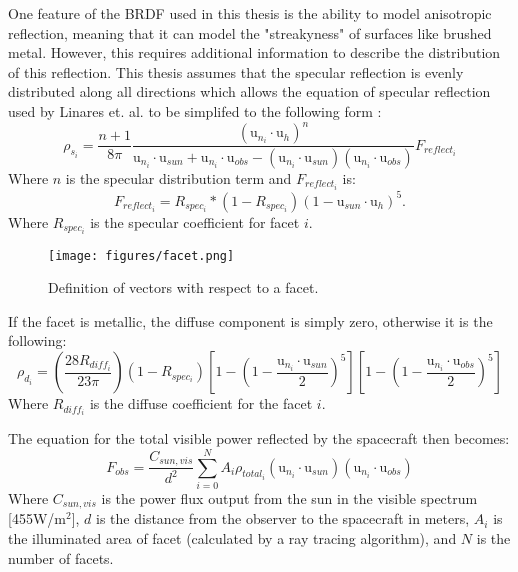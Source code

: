 One feature of the BRDF used in this thesis is the ability to model anisotropic reflection, meaning that it can model the "streakyness" of surfaces like brushed metal. However, this requires additional information to describe the distribution of this reflection. This thesis assumes that the specular reflection is evenly distributed along all directions which allows the equation of specular reflection used by Linares et. al. to be simplifed to the following form \cite{Linares_data_fusion}:
\begin{equation}\label{Phong_Specular}
\rho_{s_i} = \frac{n + 1}{8\pi}
\frac{(\bm{\mathrm{u}}_{n_i}\cdotp \bm{\mathrm{u}}_h)^n}
{\bm{\mathrm{u}}_{n_i}\cdotp \bm{\mathrm{u}}_{sun} + \bm{\mathrm{u}}_{n_i}\cdotp \bm{\mathrm{u}}_{obs} - (\bm{\mathrm{u}}_{n_i}\cdotp \bm{\mathrm{u}}_{sun})(\bm{\mathrm{u}}_{n_i}\cdotp \bm{\mathrm{u}}_{obs})}F_{reflect_i}
\end{equation}
Where $n$ is the specular distribution term and $F_{reflect_i}$ is:
\begin{equation}
F_{reflect_i} = R_{spec_i}*(1 - R_{spec_i})(1 - \bm{\mathrm{u}}_{sun}\cdotp \bm{\mathrm{u}}_h)^5.
\end{equation}
Where $R_{spec_i}$ is the specular coefficient for facet $i$.

\begin{figure}[h!]
	\centering
	\texttt{[image: figures/facet.png]}
	\caption{Definition of vectors with respect to a facet.}
	\label{facet}
\end{figure}

If the facet is metallic, the diffuse component is simply zero, otherwise it is the following:
\begin{equation}\label{Phong_Diffuse}
\rho_{d_i} = \left(\frac{28R_{diff_i}}{23\pi}\right)
(1 - R_{spec_i})
\left[1 - (1 - \frac{\bm{\mathrm{u}}_{n_i}\cdotp \bm{\mathrm{u}}_{sun}}{2})^5\right]
\left[1 - (1 - \frac{\bm{\mathrm{u}}_{n_i}\cdotp \bm{\mathrm{u}}_{obs}}{2})^5\right]
\end{equation}
Where $R_{diff_i}$ is the diffuse coefficient for the facet $i$.

The equation for the total visible power reflected by the spacecraft then becomes:
\begin{equation}
F_{obs} = \frac{C_{sun,vis}}{{d^2}}\sum_{i=0}^N A_i\rho_{total_i}(\bm{\mathrm{u}}_{n_i}\cdotp \bm{\mathrm{u}}_{sun})(\bm{\mathrm{u}}_{n_i}\cdotp \bm{\mathrm{u}}_{obs})
\end{equation}
Where $C_{sun,vis}$ is the power flux output from the sun in the visible spectrum [455W/m$^2$], $d$ is the distance from the observer to the spacecraft in meters, $A_i$ is the illuminated area of facet (calculated by a ray tracing algorithm), and $N$ is the number of facets.

